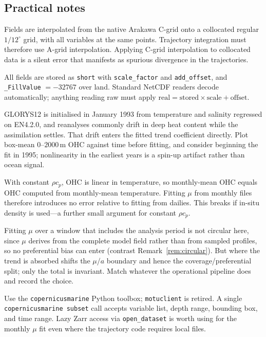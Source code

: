 \documentclass[11pt]{article}
\begin{document}
\subsection{Practical notes}
\label{sec:practical}

\begin{description}[leftmargin=*,style=nextline]
  \item[The distributed product is not a C-grid.] Fields are interpolated from the native
    Arakawa C-grid onto a collocated regular $1/12^\circ$ grid, with all variables at the same
    points. Trajectory integration must therefore use A-grid interpolation. Applying C-grid
    interpolation to collocated data is a silent error that manifests as spurious divergence in
    the trajectories.
  \item[Packed integers.] All fields are stored as \texttt{short} with \texttt{scale\_factor}
    and \texttt{add\_offset}, and \texttt{\_FillValue} $=-32767$ over land. Standard NetCDF
    readers decode automatically; anything reading raw must apply
    $\text{real} = \text{stored} \times \text{scale} + \text{offset}$.
  \item[Reanalysis spin-up.] GLORYS12 is initialised in January 1993 from temperature and
    salinity regressed on EN4.2.0, and reanalyses commonly drift in deep heat content while the
    assimilation settles. That drift enters the fitted trend coefficient directly. Plot box-mean
    $0$--$2000$\,m OHC against time before fitting, and consider beginning the fit in 1995;
    nonlinearity in the earliest years is a spin-up artifact rather than ocean signal.
  \item[Linearity of the vertical integral.] With constant $\rho c_p$, OHC is linear in
    temperature, so monthly-mean OHC equals OHC computed from monthly-mean temperature. Fitting
    $\mu$ from monthly files therefore introduces no error relative to fitting from dailies.
    This breaks if in-situ density is used---a further small argument for constant $\rho c_p$.
  \item[Baseline choice moves the split, not the total.] Fitting $\mu$ over a window that
    includes the analysis period is not circular here, since $\mu$ derives from the complete
    model field rather than from sampled profiles, so no preferential bias can enter (contrast
    Remark~\ref{rem:circular}). But where the trend is absorbed shifts the $\mu$/$a$ boundary
    and hence the coverage/preferential split; only the total is invariant. Match whatever the
    operational pipeline does and record the choice.
  \item[Access.] Use the \texttt{copernicusmarine} Python toolbox; \texttt{motuclient} is
    retired. A single \texttt{copernicusmarine subset} call accepts variable list, depth range,
    bounding box, and time range. Lazy Zarr access via \texttt{open\_dataset} is worth using for
    the monthly $\mu$ fit even where the trajectory code requires local files.
\end{description}
\end{document}
